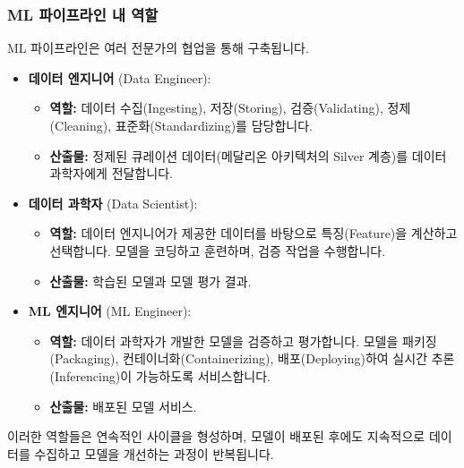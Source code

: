 \documentclass[11pt,a4paper]{article}
\theoremstyle{definition}
\begin{document}
\subsubsection*{ML 파이프라인 내 역할}
ML 파이프라인은 여러 전문가의 협업을 통해 구축됩니다.
\begin{itemize}
    \item \textbf{데이터 엔지니어} (Data Engineer):
    \begin{itemize}
        \item \textbf{역할:} 데이터 수집(Ingesting), 저장(Storing), 검증(Validating), 정제(Cleaning), 표준화(Standardizing)를 담당합니다.
        \item \textbf{산출물:} 정제된 큐레이션 데이터(메달리온 아키텍처의 Silver 계층)를 데이터 과학자에게 전달합니다.
    \end{itemize}
    \item \textbf{데이터 과학자} (Data Scientist):
    \begin{itemize}
        \item \textbf{역할:} 데이터 엔지니어가 제공한 데이터를 바탕으로 특징(Feature)을 계산하고 선택합니다. 모델을 코딩하고 훈련하며, 검증 작업을 수행합니다.
        \item \textbf{산출물:} 학습된 모델과 모델 평가 결과.
    \end{itemize}
    \item \textbf{ML 엔지니어} (ML Engineer):
    \begin{itemize}
        \item \textbf{역할:} 데이터 과학자가 개발한 모델을 검증하고 평가합니다. 모델을 패키징(Packaging), 컨테이너화(Containerizing), 배포(Deploying)하여 실시간 추론(Inferencing)이 가능하도록 서비스합니다.
        \item \textbf{산출물:} 배포된 모델 서비스.
    \end{itemize}
\end{itemize}
이러한 역할들은 연속적인 사이클을 형성하며, 모델이 배포된 후에도 지속적으로 데이터를 수집하고 모델을 개선하는 과정이 반복됩니다.
\end{document}
